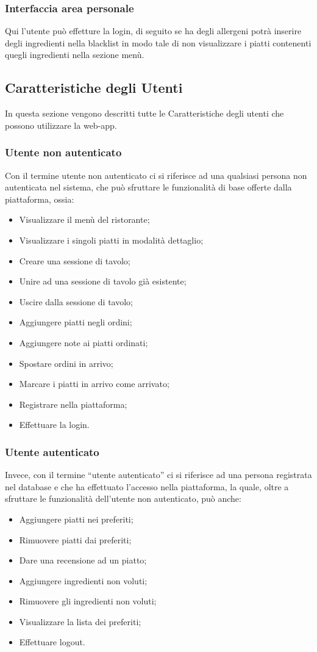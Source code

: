 \subsubsection{Interfaccia area personale}
Qui l'utente può effetture la login, di seguito se ha degli allergeni potrà inserire degli ingredienti nella blacklist in modo tale di non visualizzare i piatti contenenti quegli ingredienti nella sezione menù.
\subsection{Caratteristiche degli Utenti}
In questa sezione vengono descritti tutte le Caratteristiche degli utenti che possono utilizzare la web-app.
\subsubsection{Utente non autenticato}
Con il termine utente non autenticato ci si riferisce ad una qualsiasi persona non autenticata nel sistema, che può sfruttare le funzionalità di base offerte dalla piattaforma, ossia:
\begin{itemize}
    \item Visualizzare il menù del ristorante;
    \item Visualizzare i singoli piatti in modalità dettaglio;
    \item Creare una sessione di tavolo;
    \item Unire ad una sessione di tavolo già esistente;
    \item Uscire dalla sessione di tavolo;
    \item Aggiungere piatti negli ordini;
    \item Aggiungere note ai piatti ordinati;
    \item Spostare ordini in arrivo;
    \item Marcare i piatti in arrivo come arrivato;
    \item Registrare nella piattaforma;
    \item Effettuare la login.
\end{itemize}
\subsubsection{Utente autenticato}
Invece, con il termine “utente autenticato” ci si riferisce ad una persona registrata nel database e che ha effettuato l'accesso nella piattaforma, la quale, oltre a sfruttare le funzionalità dell'utente non autenticato, può anche:
\begin{itemize}
    \item Aggiungere piatti nei preferiti;
    \item Rimuovere piatti dai preferiti;
    \item Dare una recensione ad un piatto;
    \item Aggiungere ingredienti non voluti;
    \item Rimuovere gli ingredienti non voluti;
    \item Visualizzare la lista dei preferiti;
    \item Effettuare logout.
\end{itemize}

